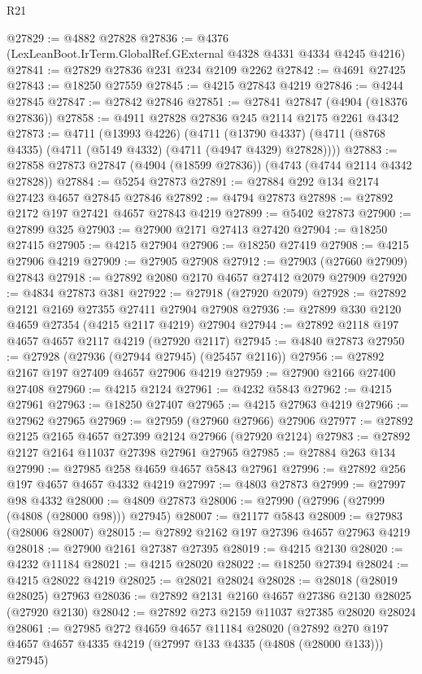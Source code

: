 \begin{lexlean}{R21}
\begin{coremodule}
@27829 := @4882 @27828
@27836 := @4376 (LexLeanBoot.IrTerm.GlobalRef.GExternal @4328 @4331 @4334 @4245 @4216)
@27841 := @27829 @27836 @231 @234 @2109 @2262
@27842 := @4691 @27425
@27843 := @18250 @27559
@27845 := @4215 @27843 @4219
@27846 := @4244 @27845
@27847 := @27842 @27846
@27851 := @27841 @27847 (@4904 (@18376 @27836))
@27858 := @4911 @27828 @27836 @245 @2114 @2175 @2261 @4342
@27873 := @4711
    (@13993 @4226)
    (@4711 (@13790 @4337) (@4711 (@8768 @4335) (@4711 (@5149 @4332) (@4711 (@4947 @4329) @27828))))
@27883 := @27858 @27873 @27847 (@4904 (@18599 @27836)) (@4743 (@4744 @2114 @4342 @27828))
@27884 := @5254 @27873
@27891 := @27884 @292 @134 @2174 @27423 @4657 @27845 @27846
@27892 := @4794 @27873
@27898 := @27892 @2172 @197 @27421 @4657 @27843 @4219
@27899 := @5402 @27873
@27900 := @27899 @325
@27903 := @27900 @2171 @27413 @27420
@27904 := @18250 @27415
@27905 := @4215 @27904
@27906 := @18250 @27419
@27908 := @4215 @27906 @4219
@27909 := @27905 @27908
@27912 := @27903 (@27660 @27909) @27843
@27918 := @27892 @2080 @2170 @4657 @27412 @2079 @27909
@27920 := @4834 @27873 @381
@27922 := @27918 (@27920 @2079)
@27928 := @27892 @2121 @2169 @27355 @27411 @27904 @27908
@27936 := @27899 @330 @2120 @4659 @27354 (@4215 @2117 @4219) @27904
@27944 := @27892 @2118 @197 @4657 @4657 @2117 @4219 (@27920 @2117)
@27945 := @4840 @27873
@27950 := @27928 (@27936 (@27944 @27945) (@25457 @2116))
@27956 := @27892 @2167 @197 @27409 @4657 @27906 @4219
@27959 := @27900 @2166 @27400 @27408
@27960 := @4215 @2124
@27961 := @4232 @5843
@27962 := @4215 @27961
@27963 := @18250 @27407
@27965 := @4215 @27963 @4219
@27966 := @27962 @27965
@27969 := @27959 (@27960 @27966) @27906
@27977 := @27892 @2125 @2165 @4657 @27399 @2124 @27966 (@27920 @2124)
@27983 := @27892 @2127 @2164 @11037 @27398 @27961 @27965
@27985 := @27884 @263 @134
@27990 := @27985 @258 @4659 @4657 @5843 @27961
@27996 := @27892 @256 @197 @4657 @4657 @4332 @4219
@27997 := @4803 @27873
@27999 := @27997 @98 @4332
@28000 := @4809 @27873
@28006 := @27990 (@27996 (@27999 (@4808 (@28000 @98))) @27945)
@28007 := @21177 @5843
@28009 := @27983 (@28006 @28007)
@28015 := @27892 @2162 @197 @27396 @4657 @27963 @4219
@28018 := @27900 @2161 @27387 @27395
@28019 := @4215 @2130
@28020 := @4232 @11184
@28021 := @4215 @28020
@28022 := @18250 @27394
@28024 := @4215 @28022 @4219
@28025 := @28021 @28024
@28028 := @28018 (@28019 @28025) @27963
@28036 := @27892 @2131 @2160 @4657 @27386 @2130 @28025 (@27920 @2130)
@28042 := @27892 @273 @2159 @11037 @27385 @28020 @28024
@28061 := @27985
    @272
    @4659
    @4657
    @11184
    @28020
    (@27892 @270 @197 @4657 @4657 @4335 @4219 (@27997 @133 @4335 (@4808 (@28000 @133))) @27945)

\end{coremodule}
\end{lexlean}
